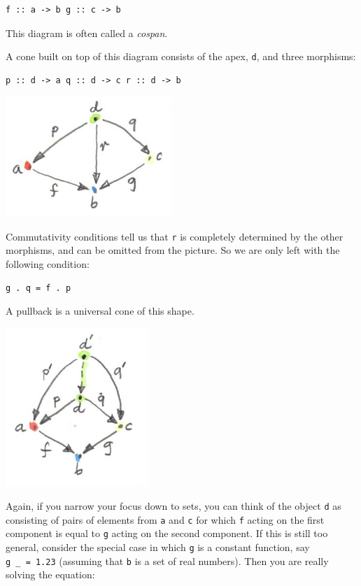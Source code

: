 \begin{verbatim}
f :: a -> b g :: c -> b
\end{verbatim}

This diagram is often called a \emph{cospan}.

A cone built on top of this diagram consists of the apex, \texttt{d},
and three morphisms:

\begin{verbatim}
p :: d -> a q :: d -> c r :: d -> b
\end{verbatim}

\includegraphics[width=2.47917in]{images/pullbackcone.jpg}

Commutativity conditions tell us that \texttt{r} is completely
determined by the other morphisms, and can be omitted from the picture.
So we are only left with the following condition:

\begin{verbatim}
g . q = f . p
\end{verbatim}

A pullback is a universal cone of this shape.

\includegraphics[width=2.12500in]{images/pullbacklimit.jpg}

Again, if you narrow your focus down to sets, you can think of the
object \texttt{d} as consisting of pairs of elements from \texttt{a} and
\texttt{c} for which \texttt{f} acting on the first component is equal
to \texttt{g} acting on the second component. If this is still too
general, consider the special case in which \texttt{g} is a constant
function, say \texttt{g\ \_\ =\ 1.23} (assuming that \texttt{b} is a set
of real numbers). Then you are really solving the equation:

